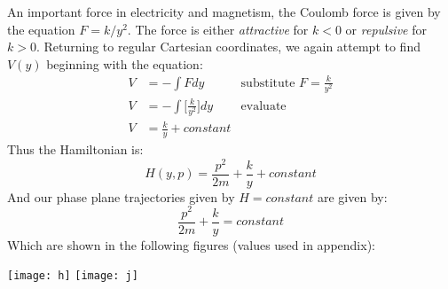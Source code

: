 \documentclass[12pt]{article}
\begin{document}
	\indent \indent An important force in electricity and magnetism, the Coulomb force is given by the equation $F=k/y^2$. The force is either \textit{attractive} for $k<0$ or \textit{repulsive} for $k>0$. Returning to regular Cartesian coordinates, we again attempt to find $V(y)$ beginning with the equation:
	\begin{align*}
	V&=-\int F dy &\text{substitute $F=\frac{k}{y^2}$}
	\\
	V&=-\int\bigg[\frac{k}{y^2}\bigg]dy &\text{evaluate}
	\\
	V&=\frac{k}{y} + constant
	\end{align*}
	\indent Thus the Hamiltonian is:
	\begin{equation*}
	H(y,p)=\frac{p^2}{2m}+\frac{k}{y} + constant
	\end{equation*}
	\indent And our phase plane trajectories given by $H=constant$ are given by:
	\begin{equation*}
	\frac{p^2}{2m}+\frac{k}{y} = constant
	\end{equation*}
	\indent Which are shown in the following figures (values used in appendix):
	\begin{center}
		\texttt{[image: h]}
		\texttt{[image: j]}
	\end{center}
	
\end{document}
